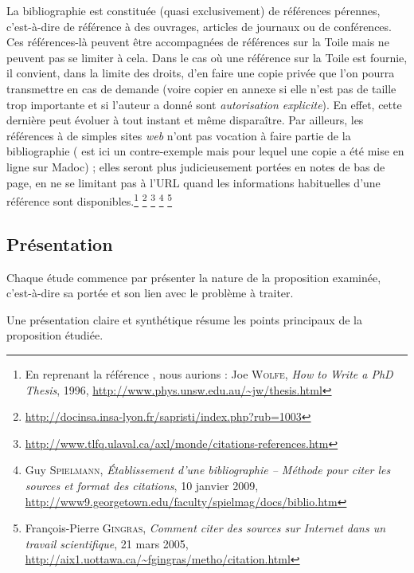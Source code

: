 \documentclass[11pt, french]{report-rd-info}
\begin{document}
La bibliographie est constituée (quasi exclusivement) de références pérennes, c'est-à-dire de référence à des ouvrages, articles de journaux ou de conférences. Ces références-là peuvent être accompagnées de références sur la Toile mais ne peuvent pas se limiter à cela. Dans le cas où une référence sur la Toile est fournie, il convient, dans la limite des droits, d'en faire une copie privée que l'on pourra transmettre en cas de demande (voire copier en annexe si elle n'est pas de taille trop importante et si l'auteur a donné sont \emph{autorisation explicite}). En effet, cette dernière peut évoluer à tout instant et même disparaître. Par ailleurs, les références à de simples sites \emph{web} n'ont pas vocation à faire partie de la bibliographie (\cite{Wolfe} est ici un contre-exemple mais pour lequel une copie a été mise en ligne sur Madoc) ; elles seront plus judicieusement portées en notes de bas de page, en ne se limitant pas à l'URL quand les informations habituelles d'une référence sont disponibles.\footnote{En reprenant la référence \cite{Wolfe}, nous aurions : Joe  \textsc{Wolfe}, \emph{How to Write a PhD Thesis}, 1996, \url{http://www.phys.unsw.edu.au/~jw/thesis.html}} \footnote{\url{http://docinsa.insa-lyon.fr/sapristi/index.php?rub=1003}} \footnote{\url{http://www.tlfq.ulaval.ca/axl/monde/citations-references.htm}} \footnote{Guy \textsc{Spielmann}, \emph{Établissement d'une bibliographie -- Méthode pour citer les sources et format des citations}, 10 janvier 2009, \url{http://www9.georgetown.edu/faculty/spielmag/docs/biblio.htm}} \footnote{François-Pierre \textsc{Gingras}, \emph{Comment citer des sources sur Internet dans un travail scientifique}, 21 mars 2005, \url{http://aix1.uottawa.ca/~fgingras/metho/citation.html}}

\subsection{Présentation}

Chaque étude commence par présenter la nature de la proposition examinée, c'est-à-dire sa portée et son lien avec le problème à traiter.

Une présentation claire et synthétique résume les points principaux de la proposition étudiée.
\end{document}
